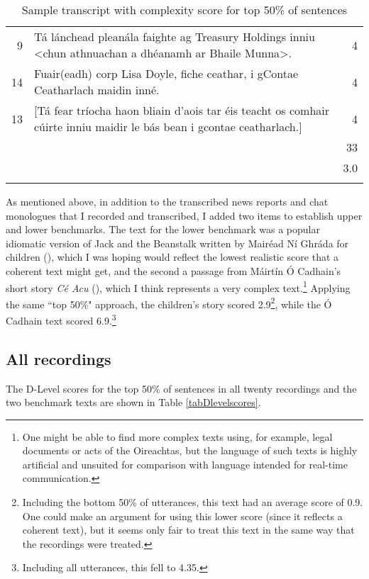 \documentclass[output=paper,colorlinks,citecolor=brown]{langscibook}
\begin{document}
\begin{table}[!htbp]
\begin{tabularx}{\textwidth}{rXr}
9& Tá lánchead pleanála faighte ag Treasury Holdings inniu <chun athnuachan a dhéanamh ar  Bhaile Munna>.& 4\\
14& Fuair(eadh) corp Lisa Doyle, fiche ceathar, i gContae Ceatharlach maidin inné.& 4\\
13& [Tá fear tríocha haon bliain d'aois tar éis teacht os comhair cúirte inniu maidir le bás bean i gcontae ceatharlach.]& 4\\
& & 33\\
& & 3.0\\
\lspbottomrule
\end{tabularx}
\caption{Sample transcript with complexity score for top 50\% of sentences}
\label{tab:chapterhandle2:keytotable}
\end{table}


As mentioned above, in addition to the transcribed news reports and chat monologues that I recorded and transcribed, I added two items to establish upper and lower benchmarks. The text for the lower benchmark was a popular idiomatic version of Jack and the Beanstalk written by Mairéad Ní Ghráda for children (\cite{ob:NiGhrada2002}), which I was hoping would reflect the lowest realistic score that a coherent text might get, and the second a passage from Máirtín Ó Cadhain's short story \textit{Cé Acu} (\cite{ob:OCadhain2009}), which I think represents a very complex text.\footnote{One might be able to find more complex texts using, for example, legal documents or acts of the Oireachtas, but the language of such texts is highly artificial and unsuited for comparison with language intended for real-time communication.} Applying the same ``top 50\%" approach, the children's story scored 2.9\footnote{Including the bottom 50\% of utterances, this text had an average score of 0.9. One could make an argument for using this lower score (since it reflects a coherent text), but it seems only fair to treat this text in the same way that the recordings were treated.}, while the Ó Cadhain text scored 6.9.\footnote{Including all utterances, this fell to 4.35.}

\subsection{All recordings}

The D-Level scores for the top 50\% of sentences in all twenty recordings and the two benchmark texts are shown in Table \ref{tabDlevelscores}. 
\end{document}
